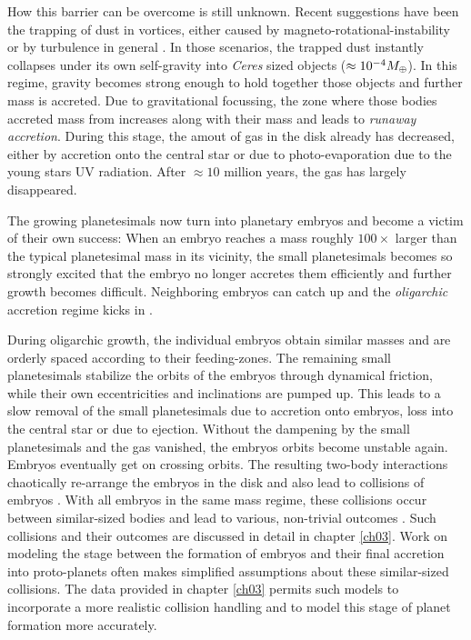 How this barrier can be overcome is still unknown. Recent suggestions have been the trapping of dust in vortices, either caused by magneto-rotational-instability \citep{Johansen:2007p37} or by turbulence in general \citep{2008ApJ...686.1292I}. In those scenarios, the trapped dust instantly collapses under its own self-gravity into \emph{Ceres} sized objects ($\approx 10^{-4} M_{\oplus}$). In this regime, gravity becomes strong enough to hold together those objects and further mass is accreted. Due to gravitational focussing, the zone where those bodies accreted mass from increases along with their mass and leads to \emph{runaway accretion}. During this stage, the amout of gas in the disk already has decreased, either by accretion onto the central star or due to photo-evaporation due to the young stars UV radiation. After $\approx 10$ million years, the gas has largely disappeared.

The growing planetesimals now turn into planetary embryos and become a victim of their own success: When an embryo reaches a mass roughly $ 100\times$ larger than the typical planetesimal mass in its vicinity, the small planetesimals becomes so strongly excited that the embryo no longer accretes them efficiently and further growth becomes difficult. Neighboring embryos can catch up and the \emph{oligarchic} accretion regime kicks in \citep{1993Icar..106..210I, 2010ApJ...714L.103O}.

During oligarchic growth, the individual embryos obtain similar masses and are orderly spaced according to their feeding-zones. The remaining small planetesimals stabilize the orbits of the embryos through dynamical friction, while their own eccentricities and inclinations are pumped up. This leads to a slow removal of the small planetesimals due to accretion onto embryos, loss into the central star or due to ejection. Without the dampening by the small planetesimals and the gas vanished, the embryos orbits become unstable again. Embryos eventually get on crossing orbits. The resulting two-body interactions chaotically re-arrange the embryos in the disk and also lead to collisions of embryos \cite{Chambers:2001p2105, Chambers:2004p4098}. With all embryos in the same mass regime, these collisions occur between similar-sized bodies and lead to various, non-trivial outcomes \citep{Asphaug:2010p3539}. Such collisions and their outcomes are discussed in detail in chapter \ref{ch03}. Work on modeling the stage between the formation of embryos and their final accretion into proto-planets \citep{Chambers:2001p2105, 2006Icar..184...39O} often makes simplified assumptions about these similar-sized collisions. The data provided in chapter \ref{ch03} permits such models to incorporate a more realistic collision handling and to model this stage of planet formation more accurately.

